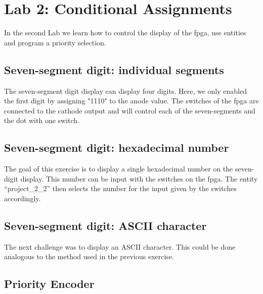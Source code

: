 \chapter{Lab 2: Conditional Assignments} \label{day2}

In the second Lab we learn how to control the display of the \gls{fpga}, use entities and program a priority selection.

\section{Seven-segment digit: individual segments}

The seven-segment digit display can display four digits. Here, we only enabled the first digit by assigning "1110" to the anode value. The switches of the \gls{fpga} are connected to the cathode output and will control each of the seven-segments and the dot with one switch. 



\section{Seven-segment digit: hexadecimal number}

The goal of this exercise is to display a single hexadecimal number on the seven-digit display. This number can be input with the switches on the \gls{fpga}. The entity ``project\_2\_2'' then selects the number for the input given by the switches accordingly. 





\section{Seven-segment digit: ASCII character}

The next challenge was to display an ASCII character. This could be done analogous to the method used in the previous exercise.





\section{Priority Encoder}

